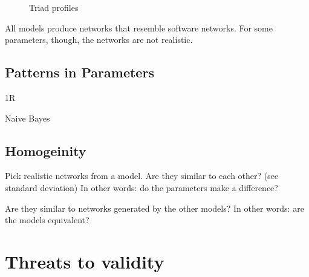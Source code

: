 \begin{figure}[!t]
\center




\caption{Triad profiles}
\label{fig:histograms}
\end{figure}

All models produce networks that resemble software networks.  For some
parameters, though, the networks are not realistic.

\subsection{Patterns in Parameters}

1R

Naive Bayes

\subsection{Homogeinity}

Pick realistic networks from a model. Are they similar to each other? (see
standard deviation) In other words: do the parameters make a difference?

Are they similar to networks generated by the other models? In other words: are
the models equivalent?

\section{Threats to validity}

